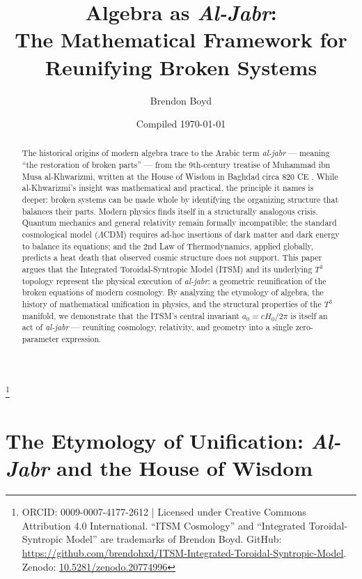 \documentclass[aps,prd,11pt,onecolumn,superscriptaddress,nofootinbib,floatfix]{revtex4-2}
\begin{document}
\title{Algebra as \textit{Al-Jabr}: \\ The Mathematical Framework for Reunifying Broken Systems}
\author{Brendon Boyd}
\thanks{ORCID: 0009-0007-4177-2612 | Licensed under Creative Commons Attribution 4.0 International. ``ITSM Cosmology'' and ``Integrated Toroidal-Syntropic Model'' are trademarks of Brendon Boyd. GitHub: \url{https://github.com/brendohxd/ITSM-Integrated-Toroidal-Syntropic-Model}. Zenodo: \href{https://doi.org/10.5281/zenodo.20774996}{10.5281/zenodo.20774996}}
\date{Compiled \today}

\begin{abstract}
The historical origins of modern algebra trace to the Arabic term \textit{al-jabr} --- meaning ``the restoration of broken parts'' --- from the 9th-century treatise of Muhammad ibn Musa al-Khwarizmi, written at the House of Wisdom in Baghdad circa 820 CE \cite{alkhwarizmi_1831}. While al-Khwarizmi's insight was mathematical and practical, the principle it names is deeper: broken systems can be made whole by identifying the organizing structure that balances their parts. Modern physics finds itself in a structurally analogous crisis. Quantum mechanics and general relativity remain formally incompatible; the standard cosmological model ($\Lambda$CDM) requires ad-hoc insertions of dark matter and dark energy to balance its equations; and the 2nd Law of Thermodynamics, applied globally, predicts a heat death that observed cosmic structure does not support. This paper argues that the Integrated Toroidal-Syntropic Model (ITSM) and its underlying $T^3$ topology represent the physical execution of \textit{al-jabr}: a geometric reunification of the broken equations of modern cosmology. By analyzing the etymology of algebra, the history of mathematical unification in physics, and the structural properties of the $T^3$ manifold, we demonstrate that the ITSM's central invariant $a_0 = cH_0/2\pi$ is itself an act of \textit{al-jabr} --- reuniting cosmology, relativity, and geometry into a single zero-parameter expression.
\end{abstract}

\maketitle

\section{The Etymology of Unification: \textit{Al-Jabr} and the House of Wisdom}
\label{sec:aljabr}
\end{document}
